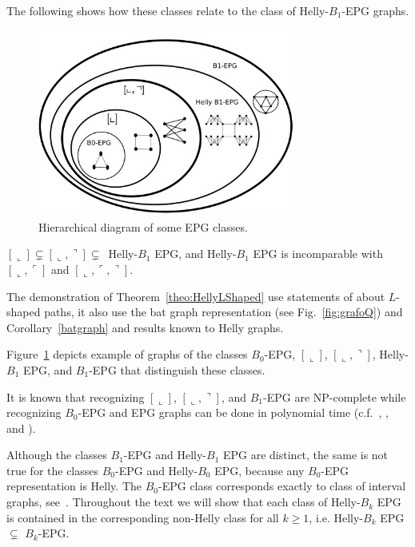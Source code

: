 The following shows how these classes relate to the class of Helly-$B_1$-EPG graphs.

%
\begin{figure}[H]	
\center%
\includegraphics[width=8.5cm]{./img/classes} %
\caption{Hierarchical diagram of some EPG classes.}
\label{fig:diagramaEPG}
\end{figure}

\begin{theorem}\label{theo:HellyLShaped}
$[\llcorner]\subsetneq [\llcorner, \urcorner]\subsetneq$~Helly-$B_1$ EPG, and Helly-$B_1$ EPG is incomparable with $[\llcorner, \ulcorner]$ and $[\llcorner, \ulcorner, \urcorner]$.
\end{theorem}

The demonstration of Theorem~\ref{theo:HellyLShaped} use statements of \cite{cameron2016edge} about $L$-shaped paths, it also use the bat graph representation (see Fig.~\ref{fig:grafoQ}) and Corollary~\ref{batgraph} and results known to Helly graphs. 

Figure~\ref{fig:diagramaEPG} depicts example of graphs of the classes $B_0$-EPG, $[\llcorner]$, $[\llcorner, \urcorner]$, Helly-$B_1$ EPG, and $B_1$-EPG that distinguish these classes.

It is known that recognizing $[\llcorner]$, $[\llcorner, \urcorner]$, and $B_1$-EPG are NP-complete while recognizing $B_0$-EPG and EPG graphs can be done in polynomial time (c.f.~\cite{booth1976}, \cite{heldt2014}, and \cite{cameron2016edge}).

Although the classes $ B_1$-EPG and Helly-$B_1$ EPG are distinct, the same is not true for the classes $B_0$-EPG and Helly-$B_0 $ EPG, because any $B_0$-EPG representation is Helly.  The $B_0$-EPG class corresponds exactly to class of interval graphs, see~\citet{booth1976}. Throughout the text we will show that each class of Helly-$B_k$ EPG is contained in the corresponding non-Helly class for all $ k \geq 1$, i.e. Helly-$B_k$ EPG $ \subsetneq$ $B_k$-EPG.

